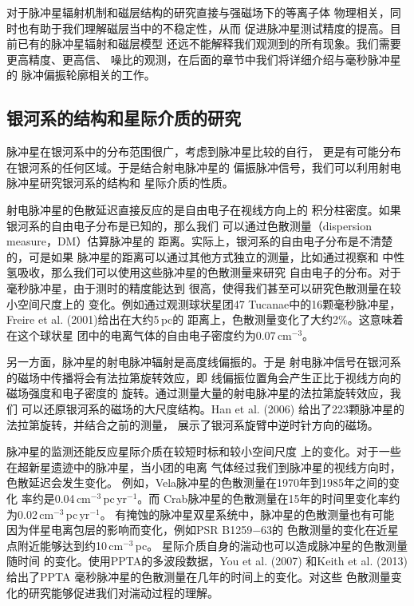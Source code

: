 对于脉冲星辐射机制和磁层结构的研究直接与强磁场下的等离子体
物理相关，同时也有助于我们理解磁层当中的不稳定性，从而
促进脉冲星测试精度的提高。目前已有的脉冲星辐射和磁层模型
还远不能解释我们观测到的所有现象。我们需要更高精度、更高信、
噪比的观测，在后面的章节中我们将详细介绍与毫秒脉冲星的
脉冲偏振轮廓相关的工作。

\subsection{银河系的结构和星际介质的研究}

脉冲星在银河系中的分布范围很广，考虑到脉冲星比较的自行，
更是有可能分布在银河系的任何区域。于是结合射电脉冲星的
偏振脉冲信号，我们可以利用射电脉冲星研究银河系的结构和
星际介质的性质。

射电脉冲星的色散延迟直接反应的是自由电子在视线方向上的
积分柱密度。如果银河系的自由电子分布是已知的，那么我们
可以通过色散测量（dispersion measure，DM）估算脉冲星的
距离。实际上，银河系的自由电子分布是不清楚的，可是如果
脉冲星的距离可以通过其他方式独立的测量，比如通过视察和
中性氢吸收，那么我们可以使用这些脉冲星的色散测量来研究
自由电子的分布。对于毫秒脉冲星，由于测时的精度能达到
很高，使得我们甚至可以研究色散测量在较小空间尺度上的
变化。例如通过观测球状星团47 Tucanae中的16颗毫秒脉冲星，
Freire et al. (2001)\supercite{fkl+01}给出在大约5\,pc的
距离上，色散测量变化了大约2\%。这意味着在这个球状星
团中的电离气体的自由电子密度约为0.07\,cm$^{-3}$。

另一方面，脉冲星的射电脉冲辐射是高度线偏振的。于是
射电脉冲信号在银河系的磁场中传播将会有法拉第旋转效应，即
线偏振位置角会产生正比于视线方向的磁场强度和电子密度的
旋转。通过测量大量的射电脉冲星的法拉第旋转效应，我们
可以还原银河系的磁场的大尺度结构。Han et al. (2006)\supercite{hml+06}
给出了223颗脉冲星的法拉第旋转，并结合之前的测量，
展示了银河系旋臂中逆时针方向的磁场。

脉冲星的监测还能反应星际介质在较短时标和较小空间尺度
上的变化。对于一些在超新星遗迹中的脉冲星，当小团的电离
气体经过我们到脉冲星的视线方向时，色散延迟会发生变化。
例如，Vela脉冲星的色散测量在1970年到1985年之间的变化
率约是0.04\,cm$^{-3}$\,pc\,yr$^{-1}$\supercite{hhc85}。而
Crab脉冲星的色散测量在15年的时间里变化率约为0.02\,cm$^{-3}$\,pc\,yr$^{-1}$\supercite{lps88}。
有掩蚀的脉冲星双星系统中，脉冲星的色散测量也有可能
因为伴星电离包层的影响而变化，例如PSR B1259$-$63的
色散测量的变化在近星点附近能够达到约10\,cm$^{-3}$\,pc\supercite{wjm04}。
星际介质自身的湍动也可以造成脉冲星的色散测量随时间
的变化。使用PPTA的多波段数据，You et al. (2007)\supercite{yhc+07}
和Keith et al. (2013)\supercite{Keith13}给出了PPTA
毫秒脉冲星的色散测量在几年的时间上的变化。对这些
色散测量变化的研究能够促进我们对湍动过程的理解。

